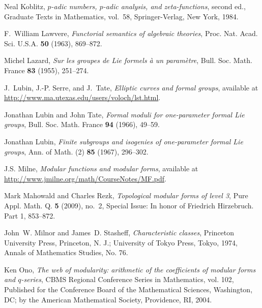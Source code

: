 \documentclass{gtpart}
\theoremstyle{definition}
\theoremstyle{remark}
\renewcommand{\=}{\approx}
\renewcommand{\-}{\sim}
\numberwithin{equation}{section}
\numberwithin{thm}{section}
\begin{document}
\begin{thebibliography}
Neal Koblitz, \emph{{$p$}-adic numbers, {$p$}-adic analysis, and
  zeta-functions}, second ed., Graduate Texts in Mathematics, vol.~58,
  Springer-Verlag, New York, 1984. 

F.~William Lawvere, \emph{Functorial semantics of algebraic theories}, Proc.
  Nat. Acad. Sci. U.S.A. \textbf{50} (1963), 869--872. 

Michel Lazard, \emph{Sur les groupes de {L}ie formels \`a un param\`etre},
  Bull. Soc. Math. France \textbf{83} (1955), 251--274. 

J.~Lubin, J.-P. Serre, and J.~Tate, \emph{Elliptic curves and formal groups}, 
  available at \href{http://www.ma.utexas.edu/users/voloch/lst.html}{http://www.ma.utexas.edu/users/voloch/lst.html}.

Jonathan Lubin and John Tate, \emph{Formal moduli for one-parameter formal
  {L}ie groups}, Bull. Soc. Math. France \textbf{94} (1966), 49--59.

Jonathan Lubin, \emph{Finite subgroups and isogenies of one-parameter formal
  {L}ie groups}, Ann. of Math. (2) \textbf{85} (1967), 296--302. 

J.S. Milne, \emph{Modular functions and modular forms}, 
  available at \href{http://www.jmilne.org/math/CourseNotes/MF.pdf}{http://www.jmilne.org\linebreak/math/CourseNotes/MF.pdf}.

Mark Mahowald and Charles Rezk, \emph{Topological modular forms of level 3},
  Pure Appl. Math. Q. \textbf{5} (2009), no.~2, Special Issue: In honor of
  Friedrich Hirzebruch. Part 1, 853--872. 

John~W. Milnor and James~D. Stasheff, \emph{Characteristic classes}, Princeton
  University Press, Princeton, N. J.; University of Tokyo Press, Tokyo, 1974,
  Annals of Mathematics Studies, No. 76. 

Ken Ono, \emph{The web of modularity: arithmetic of the coefficients of modular
  forms and {$q$}-series}, CBMS Regional Conference Series in Mathematics, vol.
  102, Published for the Conference Board of the Mathematical Sciences,
  Washington, DC; by the American Mathematical Society, Providence, RI, 2004.


\end{thebibliography}
\end{document}

